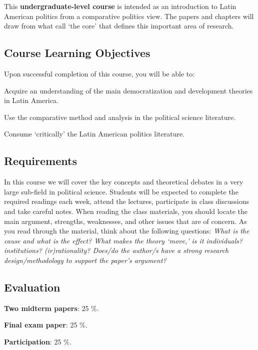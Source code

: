 \documentclass[letterpaper]{article}
\renewenvironment{itemize}{
  \begin{list}{}{
    \setlength{\leftmargin}{1.5em}
  }
}{
  \end{list}
}
\begin{document}
This {\bf {\color{blue}undergraduate-level course}} is intended as an introduction to Latin American politics from a comparative politics view. The papers and chapters will draw from what call `the core' that defines this important area of research. 



\subsection*{Course Learning Objectives}
 
Upon successful completion of this course, you will be able to:

\begin{itemize}
	\item[$\bullet$] Acquire an understanding of the main democratization and development theories in Latin America.
	\item[$\bullet$] Use the comparative method and analysis in the political science literature.
	\item[$\bullet$] Consume `critically' the Latin American politics literature.
\end{itemize}



\subsection*{Requirements}

In this course we will cover the key concepts and theoretical debates in a very large sub-field in political science. Students will be expected to complete the required readings each week, attend the lectures, participate in class discussions and take careful notes. When reading the class materials, you should locate the main argument, strengths, weaknesses, and other issues that are of concern. As you read through the material, think about the following questions: \emph{What is the cause and what is the effect? What makes the theory `move,' is it individuals? institutions? (ir)rationality? Does/do the author/s have a strong research design/methodology to support the paper's argument?}


\subsection*{Evaluation}


\begin{itemize}
	\item[$\bullet$] {\bf Two midterm papers}: 25 \%.
	\item[$\bullet$] {\bf Final exam paper}: 25 \%.
	\item[$\bullet$] {\bf Participation}: 25 \%.
\end{itemize}
\end{document}
